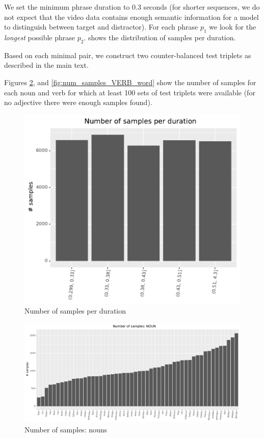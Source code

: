 We set the minimum phrase duration to 0.3 seconds (for shorter sequences, we do not expect that the video data contains enough semantic information for a model to distinguish between target and distractor). For each phrase $p_1$ we look for the \textit{longest} possible phrase $p_2$.  shows the distribution of samples per duration.

Based on each minimal pair, we construct two counter-balanced test triplets as described in the main text.

Figures \ref{fig:num_samples_NOUN_word}, and \ref{fig:num_samples_VERB_word} show the number of samples for each noun and verb for which at least 100 sets of test triplets were available (for no adjective there were enough samples found).


\begin{figure}
  \centering
  \includegraphics[width=\textwidth]{results/targeted_triplets/num_samples_per_duration.pdf}
  \caption{Number of samples per duration}
  \label{fig:num_samples_vs_duration}
\end{figure}


\begin{figure}
  \centering
  \includegraphics[width=\textwidth]{results/targeted_triplets/num_samples_per_word_NOUN.pdf}
  \caption{Number of samples: nouns}
  \label{fig:num_samples_NOUN_word}
\end{figure}

